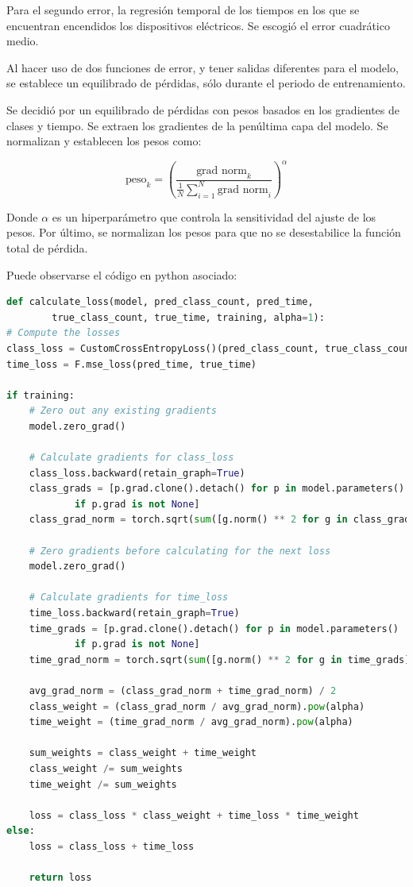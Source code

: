 Para el segundo error, la regresión temporal de los tiempos en los que se encuentran encendidos los dispositivos eléctricos. Se escogió el error cuadrático medio.

Al hacer uso de dos funciones de error, y tener salidas diferentes para el modelo, se establece un equilibrado de pérdidas, sólo durante el periodo de entrenamiento.

Se decidió por un equilibrado de pérdidas con pesos basados en los gradientes de clases y tiempo. Se extraen los gradientes de la penúltima capa del modelo. Se normalizan y establecen los pesos como: 

$$
\text{peso}_k={(\frac{\text{grad norm}_k}{\frac{1}{N}\sum_{i=1}^{N}\text{grad norm}_i})}^\alpha
$$

Donde $\alpha$ es un hiperparámetro que controla la sensitividad del ajuste de los pesos.
Por último, se normalizan los pesos para que no se desestabilice la función total de pérdida.

Puede observarse el código en python asociado:
\begin{lstlisting}[language=python]
def calculate_loss(model, pred_class_count, pred_time, 
        true_class_count, true_time, training, alpha=1):
# Compute the losses
class_loss = CustomCrossEntropyLoss()(pred_class_count, true_class_count)
time_loss = F.mse_loss(pred_time, true_time)

if training:
    # Zero out any existing gradients
    model.zero_grad()

    # Calculate gradients for class_loss
    class_loss.backward(retain_graph=True)
    class_grads = [p.grad.clone().detach() for p in model.parameters()
            if p.grad is not None]
    class_grad_norm = torch.sqrt(sum([g.norm() ** 2 for g in class_grads]))

    # Zero gradients before calculating for the next loss
    model.zero_grad()

    # Calculate gradients for time_loss
    time_loss.backward(retain_graph=True)
    time_grads = [p.grad.clone().detach() for p in model.parameters() 
            if p.grad is not None]
    time_grad_norm = torch.sqrt(sum([g.norm() ** 2 for g in time_grads]))

    avg_grad_norm = (class_grad_norm + time_grad_norm) / 2
    class_weight = (class_grad_norm / avg_grad_norm).pow(alpha)
    time_weight = (time_grad_norm / avg_grad_norm).pow(alpha)

    sum_weights = class_weight + time_weight
    class_weight /= sum_weights
    time_weight /= sum_weights

    loss = class_loss * class_weight + time_loss * time_weight
else:
    loss = class_loss + time_loss

    return loss
\end{lstlisting}

